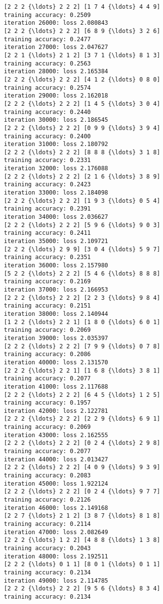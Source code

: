 \documentclass[11pt]{article}
\begin{document}
\begin{Verbatim}[commandchars=\\\{\}]
[2 2 2 {\ldots} 2 2 2] [1 7 4 {\ldots} 4 4 9]
training accuracy: 0.2509
iteration 26000: loss 2.080843
[2 2 2 {\ldots} 2 2 2] [6 8 9 {\ldots} 3 2 6]
training accuracy: 0.2477
iteration 27000: loss 2.047627
[2 2 1 {\ldots} 2 1 2] [3 7 1 {\ldots} 8 1 3]
training accuracy: 0.2563
iteration 28000: loss 2.165384
[2 2 2 {\ldots} 2 2 2] [4 1 2 {\ldots} 0 8 0]
training accuracy: 0.2574
iteration 29000: loss 2.162018
[2 2 2 {\ldots} 2 2 2] [1 4 5 {\ldots} 3 0 4]
training accuracy: 0.2440
iteration 30000: loss 2.186545
[2 2 2 {\ldots} 2 2 2] [0 9 9 {\ldots} 3 9 4]
training accuracy: 0.2400
iteration 31000: loss 2.180792
[2 2 2 {\ldots} 2 2 2] [8 8 8 {\ldots} 3 1 8]
training accuracy: 0.2331
iteration 32000: loss 2.176088
[2 2 2 {\ldots} 2 2 2] [2 1 6 {\ldots} 3 8 9]
training accuracy: 0.2423
iteration 33000: loss 2.184098
[2 2 2 {\ldots} 2 2 2] [1 9 3 {\ldots} 0 5 4]
training accuracy: 0.2391
iteration 34000: loss 2.036627
[2 2 2 {\ldots} 2 2 2] [5 9 6 {\ldots} 9 0 3]
training accuracy: 0.2411
iteration 35000: loss 2.109721
[2 2 2 {\ldots} 2 9 9] [3 0 4 {\ldots} 5 9 7]
training accuracy: 0.2351
iteration 36000: loss 2.157980
[5 2 2 {\ldots} 2 2 2] [5 4 6 {\ldots} 8 8 8]
training accuracy: 0.2169
iteration 37000: loss 2.166953
[2 2 2 {\ldots} 2 2 2] [2 2 3 {\ldots} 9 8 4]
training accuracy: 0.2151
iteration 38000: loss 2.140944
[1 2 2 {\ldots} 2 2 1] [1 8 0 {\ldots} 6 0 1]
training accuracy: 0.2069
iteration 39000: loss 2.035397
[2 2 2 {\ldots} 2 2 2] [7 9 9 {\ldots} 0 7 8]
training accuracy: 0.2086
iteration 40000: loss 2.131570
[2 2 2 {\ldots} 2 2 1] [1 6 8 {\ldots} 3 8 1]
training accuracy: 0.2077
iteration 41000: loss 2.117688
[2 2 2 {\ldots} 2 2 2] [6 4 5 {\ldots} 1 2 5]
training accuracy: 0.1957
iteration 42000: loss 2.122781
[2 2 2 {\ldots} 2 2 2] [2 2 9 {\ldots} 6 9 1]
training accuracy: 0.2069
iteration 43000: loss 2.162555
[2 2 2 {\ldots} 2 2 2] [0 2 4 {\ldots} 2 9 8]
training accuracy: 0.2077
iteration 44000: loss 2.013427
[2 2 2 {\ldots} 2 2 2] [4 0 9 {\ldots} 9 3 9]
training accuracy: 0.2083
iteration 45000: loss 1.922124
[2 2 2 {\ldots} 2 2 2] [0 2 4 {\ldots} 9 7 7]
training accuracy: 0.2126
iteration 46000: loss 2.149168
[2 2 7 {\ldots} 2 1 2] [3 8 7 {\ldots} 8 1 8]
training accuracy: 0.2114
iteration 47000: loss 2.082649
[2 2 2 {\ldots} 1 2 2] [4 8 8 {\ldots} 1 3 8]
training accuracy: 0.2043
iteration 48000: loss 2.192511
[2 2 2 {\ldots} 0 1 1] [8 0 1 {\ldots} 0 1 1]
training accuracy: 0.2134
iteration 49000: loss 2.114785
[2 2 2 {\ldots} 2 2 2] [9 5 6 {\ldots} 8 3 4]
training accuracy: 0.2134

    \end{Verbatim}
\end{document}
